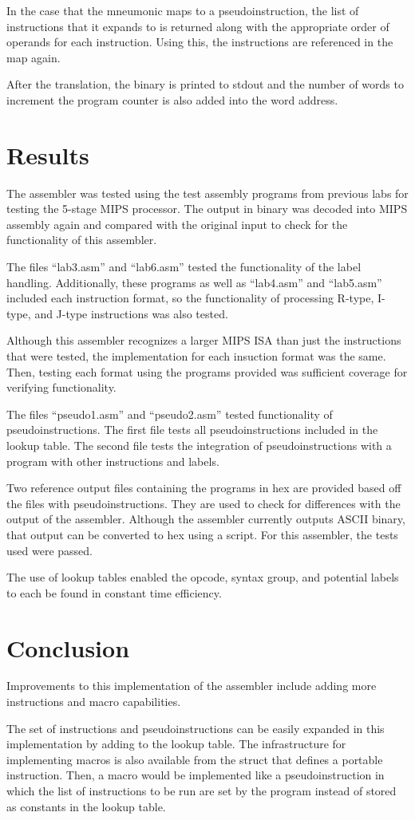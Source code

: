 \documentclass[titlepage]{article}
\begin{document}
In the case that the mneumonic maps to a pseudoinstruction, the list of 
instructions that it expands to is returned along with the appropriate order of
operands for each instruction. Using this, the instructions are referenced in 
the map again.

After the translation, the binary is printed to stdout and the number of words 
to increment the program counter is also added into the word address. 

\section*{Results}

The assembler was tested using the test assembly programs from previous labs for
testing the 5-stage MIPS processor. The output in binary was decoded into MIPS 
assembly again and compared with the original input to check for the 
functionality of this assembler.

The files ``lab3.asm'' and ``lab6.asm'' tested the functionality of the label 
handling. Additionally, these programs as well as ``lab4.asm'' and ``lab5.asm'' 
included each instruction format, so the functionality of processing R-type, 
I-type, and J-type instructions was also tested. 

Although this assembler recognizes a larger MIPS ISA than just the instructions
that were tested, the implementation for each insuction format was the same. 
Then, testing each format using the programs provided was sufficient coverage 
for verifying functionality.

The files ``pseudo1.asm'' and ``pseudo2.asm'' tested functionality of 
pseudoinstructions. The first file tests all pseudoinstructions included in the
lookup table. The second file tests the integration of pseudoinstructions with
a program with other instructions and labels. 

Two reference output files containing the programs in hex are provided based off
the files with pseudoinstructions. They are used to check for differences with 
the output of the assembler. Although the assembler currently outputs ASCII 
binary, that output can be converted to hex using a script. For this assembler, 
the tests used were passed.

The use of lookup tables enabled the opcode, syntax group, and potential labels 
to each be found in constant time efficiency. 

\section*{Conclusion}
Improvements to this implementation of the assembler include adding more 
instructions and macro capabilities.

The set of instructions and pseudoinstructions can be easily expanded in this
implementation by adding to the lookup table. The infrastructure for 
implementing macros is also available from the struct that defines a portable
instruction. Then, a macro would be implemented like a pseudoinstruction in 
which the list of instructions to be run are set by the program instead of 
stored as constants in the lookup table.
\end{document}
